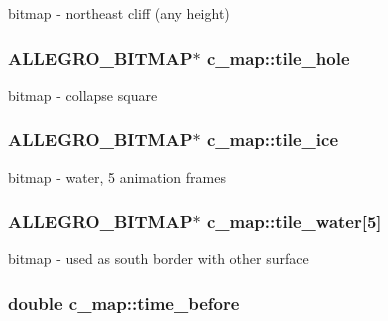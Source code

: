 bitmap -\/ northeast cliff (any height) \hypertarget{classc__map_a539c61c09b1a762ef657139f22ebd7c1}{
\subsubsection[{tile\-\_\-hole}]{\setlength{\rightskip}{0pt plus 5cm}A\-L\-L\-E\-G\-R\-O\-\_\-\-B\-I\-T\-M\-A\-P$\ast$ c\-\_\-map\-::tile\-\_\-hole\hspace{0.3cm}{\ttfamily [protected]}}}\label{classc__map_a539c61c09b1a762ef657139f22ebd7c1}
bitmap -\/ collapse square \hypertarget{classc__map_a12e5d9ac851eba093b98998593b7f3a9}{
\subsubsection[{tile\-\_\-ice}]{\setlength{\rightskip}{0pt plus 5cm}A\-L\-L\-E\-G\-R\-O\-\_\-\-B\-I\-T\-M\-A\-P$\ast$ c\-\_\-map\-::tile\-\_\-ice\hspace{0.3cm}{\ttfamily [protected]}}}\label{classc__map_a12e5d9ac851eba093b98998593b7f3a9}
bitmap -\/ water, 5 animation frames \hypertarget{classc__map_a1d7fc093a6e24ba1ea66b66505ad8581}{
\subsubsection[{tile\-\_\-water}]{\setlength{\rightskip}{0pt plus 5cm}A\-L\-L\-E\-G\-R\-O\-\_\-\-B\-I\-T\-M\-A\-P$\ast$ c\-\_\-map\-::tile\-\_\-water\mbox{[}5\mbox{]}\hspace{0.3cm}{\ttfamily [protected]}}}\label{classc__map_a1d7fc093a6e24ba1ea66b66505ad8581}
bitmap -\/ used as south border with other surface \hypertarget{classc__map_ab59ec9afe1f17edc59308fe5392b99bd}{
\subsubsection[{time\-\_\-before}]{\setlength{\rightskip}{0pt plus 5cm}double c\-\_\-map\-::time\-\_\-before\hspace{0.3cm}{\ttfamily [protected]}}}\label{classc__map_ab59ec9afe1f17edc59308fe5392b99bd}
